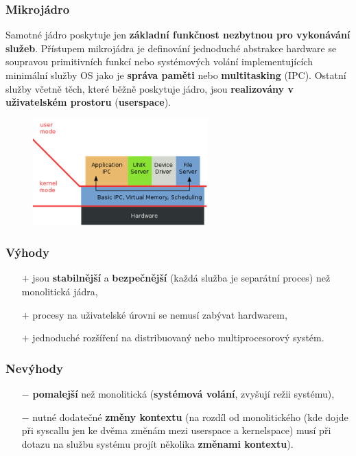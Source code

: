 \subsubsection{Mikrojádro}
Samotné jádro poskytuje jen \textbf{základní funkčnost nezbytnou pro vykonávání služeb}. Přístupem mikrojádra je definování jednoduché abstrakce hardware se soupravou primitivních funkcí nebo systémových volání implementujících minimální služby OS jako je \textbf{správa paměti} nebo \textbf{multitasking} (IPC). Ostatní služby včetně těch, které běžně poskytuje jádro, jsou \textbf{realizovány v uživatelském prostoru} (\textbf{userspace}).
\begin{figure}[H]
\centering
\includegraphics[width=0.6\textwidth]{assets/3_microkernel}
\end{figure}
\subsubsection*{Výhody}
\begin{itemize}
\item[$+$] jsou \textbf{stabilnější} a \textbf{bezpečnější} (každá služba je separátní proces) než monolitická jádra,
\item[$+$] procesy na uživatelské úrovni se nemusí zabývat hardwarem,
\item[$+$] jednoduché rozšíření na distribuovaný nebo multiprocesorový systém.
\end{itemize}
\subsubsection*{Nevýhody}
\begin{itemize}
\item[$-$] \textbf{pomalejší} než monolitická (\textbf{systémová volání}, zvyšují režii systému),
\item[$-$] nutné dodatečné \textbf{změny kontextu} (na rozdíl od monolitického (kde dojde při syscallu jen ke dvěma změnám mezi userspace a kernelspace) musí při dotazu na službu systému projít několika \textbf{změnami kontextu}).
\end{itemize}
